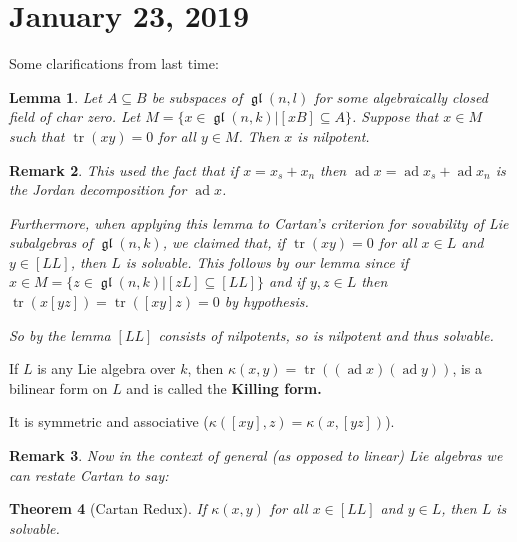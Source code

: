 \documentclass[12pt]{article}
\theoremstyle{nonumberbreak}
\theoremstyle{changebreak}
\newtheorem{thm}{Theorem}[subsection]
\newtheorem{lem}[thm]{Lemma}
\theoremstyle{nonumberbreak}
\theoremstyle{change}
\newtheorem{rmk}[thm]{Remark}
\DeclareMathOperator{\gl}{\mathfrak{gl}}
\DeclareMathOperator{\tr}{tr}
\DeclareMathOperator{\ad}{ad}
\begin{document}
\section{January 23, 2019}
Some clarifications from last time:
\begin{lem}
	Let $A\subseteq B$ be subspaces of $\gl(n,l)$ for some algebraically closed field of char zero.
	Let $M=\{x\in\gl(n,k)|[xB]\subseteq A\}$. Suppose that $x\in M$ such that $\tr(xy)=0$ for all $y\in M$.
	Then $x$ is nilpotent.
\end{lem}
\begin{rmk}
	This used the fact that if $x=x_s+x_n$ then $\ad x=\ad x_s+\ad x_n$ is the Jordan decomposition for $\ad x$.

	Furthermore, when applying this lemma to Cartan's criterion for sovability of Lie subalgebras of $\gl(n,k)$, 
	we claimed that, if $\tr(xy)=0$ for all $x\in L$ and $y\in [LL]$, then $L$ is solvable. This follows by our lemma
	since if $x\in M=\{z\in\gl(n,k)|[zL]\subseteq[LL]\}$ and if $y,z\in L$ then $\tr(x[yz])=\tr([xy]z)=0$ by hypothesis.

	So by the lemma $[LL]$ consists of nilpotents, so is nilpotent and thus solvable.
\end{rmk}

\begin{defn}
	If $L$ is any Lie algebra over $k$, then $\kappa(x,y)=\tr((\ad x)(\ad y))$, is a bilinear 
	form on $L$ and is called the \textbf{Killing form.} 

	It is symmetric and associative ($\kappa([xy],z)=\kappa(x,[yz])$).
\end{defn}
\begin{rmk}
	Now in the context of \textit{general (as opposed to linear) Lie algebras} we can restate
	Cartan to say:
\end{rmk}
\begin{thm}[Cartan Redux]
	If $\kappa(x,y)$ for all $x\in [LL]$ and $y\in L$, then $L$ is solvable.
\end{thm}
\end{document}
